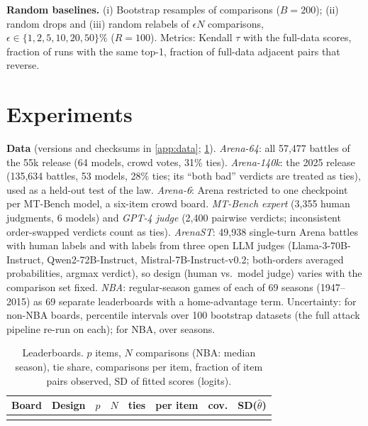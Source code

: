 \documentclass{article}
\theoremstyle{plain}
\theoremstyle{remark}
\begin{document}
\textbf{Random baselines.} (i) Bootstrap resamples of comparisons ($B=200$); (ii) random drops and (iii) random relabels of $\epsilon N$ comparisons, $\epsilon\in\{1,2,5,10,20,50\}\%$ ($R=100$). Metrics: Kendall $\tau$ with the full-data scores, fraction of runs with the same top-1, fraction of full-data adjacent pairs that reverse.

\section{Experiments}\label{sec:exp}
\textbf{Data} (versions and checksums in \cref{app:data}; \cref{tab:data}). \emph{Arena-64}: all 57,477 battles of the 55k release (64 models, crowd votes, 31\% ties). \emph{Arena-140k}: the 2025 release (135,634 battles, 53 models, 28\% ties; its ``both bad'' verdicts are treated as ties), used as a held-out test of the law. \emph{Arena-6}: Arena restricted to one checkpoint per MT-Bench model, a six-item crowd board. \emph{MT-Bench expert} (3,355 human judgments, 6 models) and \emph{GPT-4 judge} (2,400 pairwise verdicts; inconsistent order-swapped verdicts count as ties). \emph{ArenaST}: 49,938 single-turn Arena battles with human labels and with labels from three open LLM judges (Llama-3-70B-Instruct, Qwen2-72B-Instruct, Mistral-7B-Instruct-v0.2; both-orders averaged probabilities, argmax verdict), so design (human vs.\ model judge) varies with the comparison set fixed. \emph{NBA}: regular-season games of each of 69 seasons (1947--2015) as 69 separate leaderboards with a home-advantage term. Uncertainty: for non-NBA boards, percentile intervals over 100 bootstrap datasets (the full attack pipeline re-run on each); for NBA, over seasons.

\begin{table}[t]
\caption{Leaderboards. $p$ items, $N$ comparisons (NBA: median season), tie share, comparisons per item, fraction of item pairs observed, SD of fitted scores (logits).}\label{tab:data}
\centering\scriptsize\setlength{\tabcolsep}{2pt}
\begin{tabular}{llrrrrrr}
\toprule
Board & Design & $p$ & $N$ & ties & per item & cov. & SD($\hat\theta$)\\
\midrule
\\
\bottomrule
\end{tabular}
\end{table}
\end{document}

